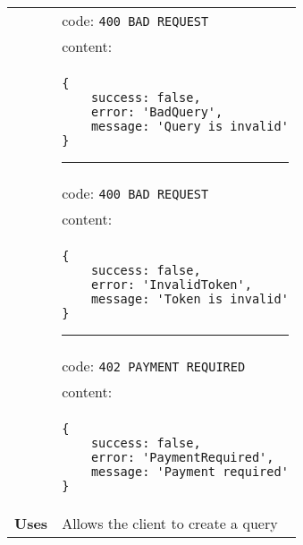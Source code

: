\begin{adjustwidth}{1cm}{}
\begin{longtable}{|c|l|}
              &                     code: \texttt{400 BAD REQUEST} \\
              &                     content: \\
              & \begin{minipage}[t]{0.7\textwidth}
                \begin{adjustwidth}{1.5cm}{}
                \begin{verbatim}
{
    success: false, 
    error: 'BadQuery',
    message: 'Query is invalid'
}
                \end{verbatim}
                \end{adjustwidth}
                 \par\noindent\rule{\textwidth}{1pt}
                 \vspace{4pt}
              \end{minipage} \\
              &                     code: \texttt{400 BAD REQUEST} \\
              &                     content: \\
              & \begin{minipage}[t]{0.7\textwidth}
                \begin{adjustwidth}{1.5cm}{}
                \begin{verbatim}
{
    success: false, 
    error: 'InvalidToken',
    message: 'Token is invalid'
}
                \end{verbatim}
                \end{adjustwidth}
                \par\noindent\rule{\textwidth}{1pt}
                 \vspace{4pt}
              \end{minipage} \\
              &                     code: \texttt{402 PAYMENT REQUIRED} \\
              &                     content: \\
              & \begin{minipage}[t]{0.7\textwidth}
                \begin{adjustwidth}{1.5cm}{}
                \begin{verbatim}
{
    success: false, 
    error: 'PaymentRequired',
    message: 'Payment required'
}
                \end{verbatim}
                \end{adjustwidth}
              \end{minipage} \\
              \hline
            \textbf{Uses} & Allows the client to create a query \\
            \hline
        \end{longtable}
    \end{adjustwidth} 
    
